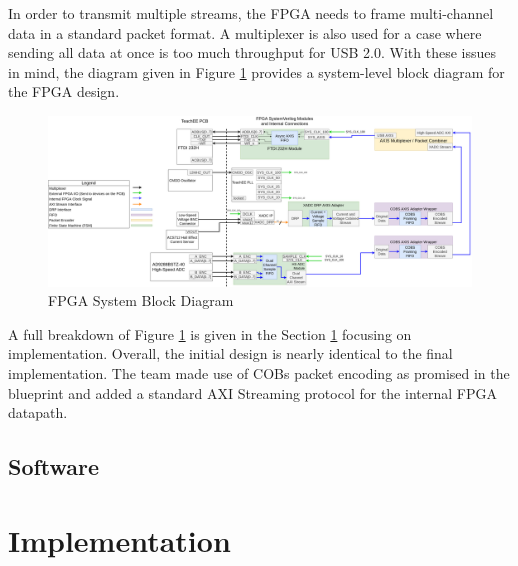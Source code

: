 \documentclass[letterpaper,11pt]{article}
\begin{document}
In order to transmit multiple streams, the FPGA needs to frame multi-channel
data in a standard packet format. A multiplexer is also used for a case where
sending all data at once is too much throughput for USB 2.0. With these issues
in mind, the diagram given in Figure \ref{fig:fpga-block-diagram} provides a
system-level block diagram for the FPGA design.

\begin{figure}[H]
  \centering
  \includegraphics[width=\textwidth]{../../misc/TeachEE-System-Diagram-FPGA.png}
  \caption{FPGA System Block Diagram}
  \label{fig:fpga-block-diagram}
\end{figure}

A full breakdown of Figure \ref{fig:fpga-block-diagram} is given in the Section
\ref{sec:impl} focusing on implementation. Overall, the initial design is nearly
identical to the final implementation. The team made use of COBs packet encoding
as promised in the blueprint and added a standard AXI Streaming protocol for the
internal FPGA datapath.

\subsection{Software} %

\section{Implementation} \label{sec:impl}

\end{document}
